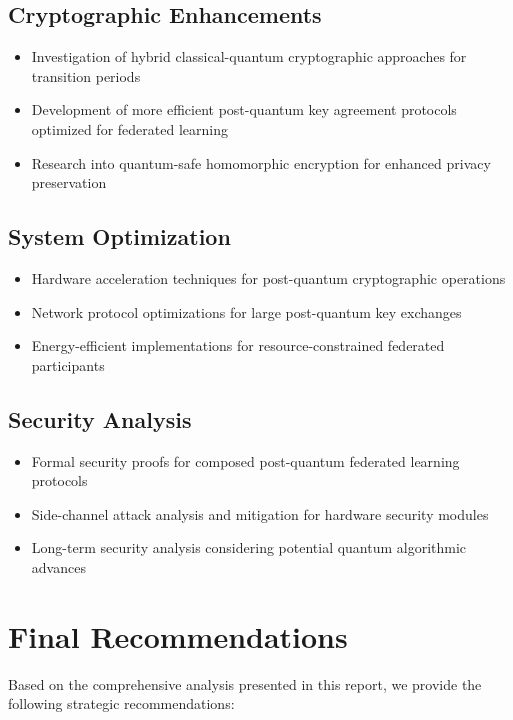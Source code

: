 \documentclass[12pt,a4paper,twoside]{book}
\begin{document}
\subsection{Cryptographic Enhancements}

\begin{itemize}
\item Investigation of hybrid classical-quantum cryptographic approaches for transition periods
\item Development of more efficient post-quantum key agreement protocols optimized for federated learning
\item Research into quantum-safe homomorphic encryption for enhanced privacy preservation
\end{itemize}

\subsection{System Optimization}

\begin{itemize}
\item Hardware acceleration techniques for post-quantum cryptographic operations
\item Network protocol optimizations for large post-quantum key exchanges
\item Energy-efficient implementations for resource-constrained federated participants
\end{itemize}

\subsection{Security Analysis}

\begin{itemize}
\item Formal security proofs for composed post-quantum federated learning protocols
\item Side-channel attack analysis and mitigation for hardware security modules
\item Long-term security analysis considering potential quantum algorithmic advances
\end{itemize}

\section{Final Recommendations}
\label{sec:final-recommendations}

Based on the comprehensive analysis presented in this report, we provide the following strategic recommendations:
\end{document}
